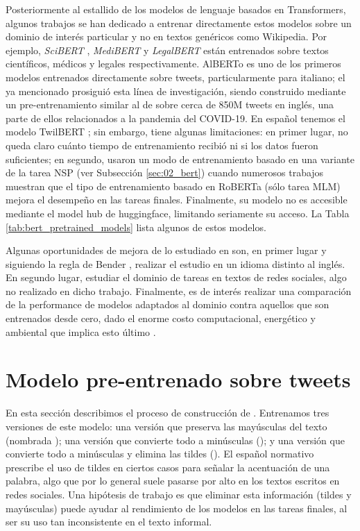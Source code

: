 Posteriormente al estallido de los modelos de lenguaje basados en Transformers, algunos trabajos se han dedicado a entrenar directamente estos modelos sobre un dominio de interés particular y no en textos genéricos como Wikipedia. Por ejemplo, \emph{SciBERT} \cite{beltagy-etal-2019-scibert}, \emph{MediBERT} \cite{rasmy2021med} y \emph{LegalBERT} \cite{chalkidis-etal-2020-legal} están entrenados sobre textos científicos, médicos y legales respectivamente. AlBERTo \cite{polignano2019alberto} es uno de los primeros modelos entrenados directamente sobre tweets, particularmente para italiano; el ya mencionado \bertweet{} \cite{dat2020bertweet} prosiguió esta línea de investigación, siendo construido mediante un pre-entrenamiento similar al de \roberta{} \cite{liu2019roberta} sobre cerca de 850M tweets en inglés, una parte de ellos relacionados a la pandemia del COVID-19. En español tenemos el modelo TwilBERT \cite{gonzalez2021twilbert}; sin embargo, tiene algunas limitaciones: en primer lugar, no queda claro cuánto tiempo de entrenamiento recibió ni si los datos fueron suficientes; en segundo, usaron un modo de entrenamiento basado en una variante de la tarea NSP (ver Subsección \ref{sec:02_bert}) cuando numerosos trabajos muestran que el tipo de entrenamiento basado en RoBERTa (sólo tarea MLM) mejora el desempeño en las tareas finales. Finalmente, su modelo no es accesible mediante el model hub de huggingface, limitando seriamente su acceso. La Tabla \ref{tab:bert_pretrained_models} lista algunos de estos modelos.


Algunas oportunidades de mejora de lo estudiado en \citet{gururangan-etal-2020-dont} son, en primer lugar y siguiendo la regla de Bender \cite{bender2011achieving}, realizar el estudio en un idioma distinto al inglés. En segundo lugar, estudiar el dominio de tareas en textos de redes sociales, algo no realizado en dicho trabajo. Finalmente, es de interés realizar una comparación de la performance de modelos adaptados al dominio contra aquellos que son entrenados desde cero, dado el enorme costo computacional, energético y ambiental que implica esto último \cite{strubell2019energy}.



\section{Modelo pre-entrenado sobre tweets}
\label{sec:robertuito_pretrained}

En esta sección describimos el proceso de construcción de \robertuito{}. Entrenamos tres versiones de este modelo: una versión que preserva las mayúsculas del texto (nombrada ); una versión que convierte todo a minúsculas (); y una versión que convierte todo a minúsculas y elimina las tildes (). El español normativo prescribe el uso de tildes en ciertos casos para señalar la acentuación de una palabra, algo que por lo general suele pasarse por alto en los textos escritos en redes sociales. Una hipótesis de trabajo es que eliminar esta información (tildes y mayúsculas) puede ayudar al rendimiento de los modelos en las tareas finales, al ser su uso tan inconsistente en el texto informal.



